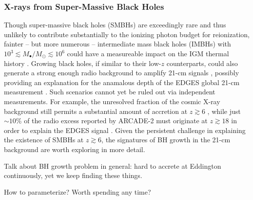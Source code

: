
\subsubsection{X-rays from Super-Massive Black Holes} \label{sec:smbhs}
Though super-massive black holes (SMBHs) are exceedingly rare and thus unlikely to contribute substantially to the ionizing photon budget for reionization, fainter -- but more numerous -- intermediate mass black holes (IMBHs) with $10^3 \lesssim M_{\bullet} / M_{\odot} \lesssim 10^6$ could have a measureable impact on the IGM thermal history \cite{Tanaka2016}. Growing black holes, if similar to their low-$z$ counterparts, could also generate a strong enough radio background to amplify 21-cm signals \cite{EwallWice2018}, possibly providing an explanation for the anamalous depth of the EDGES global 21-cm measurement \cite{Bowman2018}. Such scenarios cannot yet be ruled out via independent measurements. For example, the unresolved fraction of the cosmic X-ray background still permits a substantial amount of accretion at $z \gtrsim 6$ \cite{McQuinn2012,Fialkov2017,Mirocha2018}, while just $\sim 10$\% of the radio excess reported by ARCADE-2 \cite{Fixsen2011,Singal2018} must originate at $z \gtrsim 18$ in order to explain the EDGES signal \cite{Feng2018}. Given the persistent challenge in explaining the existence of SMBHs at $z \gtrsim 6$, the signatures of BH growth in the 21-cm background are worth exploring in more detail.


{\color{red} Talk about BH growth problem in general: hard to accrete at Eddington continuously, yet we keep finding these things.}

{\color{red} How to parameterize? Worth spending any time?}


